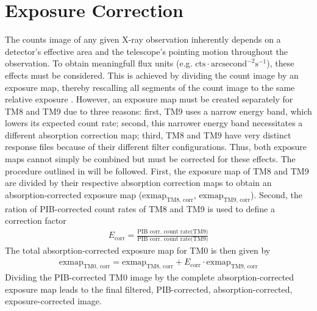 \section{Exposure Correction}
The counts image of any given X-ray observation inherently depends on a detector's effective area and the telescope's pointing motion throughout the observation. To obtain meaningfull flux units (e.g. \(\text{cts}\cdot\text{arcsecond}^{-2}\text{s}^{-1}\)), these effects must be considered. This is achieved by dividing the count image by an exposure map, thereby rescalling all segments of the count image to the same relative exposure \cite{davis2001formal}. However, an exposure map must be created separately for TM8 and TM9 due to three reasons: first, TM9 uses a narrow energy band, which lowers its expected count rate; second, this narrower energy band necessitates a different absorption correction map; third, TM8 and TM9 have very distinct response files because of their different filter configurations. Thus, both exposure maps cannot simply be combined but must be corrected for these effects. The procedure outlined in \cite{Reiprich2021} will be followed. First, the exposure map of TM8 and TM9 are divided by their respective absorption correction maps to obtain an absorption-corrected exposure map (\(\text{exmap}_\text{TM8, corr}\), \(\text{exmap}_\text{TM9, corr}\)). Second, the ration of PIB-corrected count rates of TM8 and TM9 is used to define a correction factor 
\begin{align*}
    E_\text{corr} = \frac{\text{PIB corr. count rate(TM9)}}{\text{PIB corr. count rate(TM9)}}
\end{align*}
The total absorption-corrected exposure map for TM0 is then given by
\begin{align*}
    \text{exmap}_\text{TM0, corr} = \text{exmap}_\text{TM8, corr} + E_\text{corr}\cdot\text{exmap}_\text{TM9, corr} 
\end{align*}
Dividing the PIB-corrected TM0 image by the complete absorption-corrected exposure map leads to the final filtered, PIB-corrected, absorption-corrected, exposure-corrected image.
